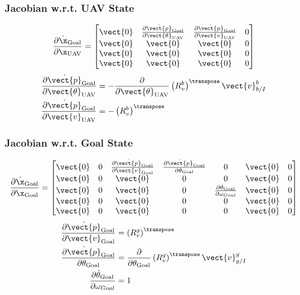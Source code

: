 \subsubsection{Jacobian w.r.t. UAV State}
\begin{equation}
  \frac{\partial \dot{\x}_{\text{Goal}}}{\partial \x_{\text{UAV}}}
  =
  \begin{bmatrix}
    \vect{0} & \frac{\partial \dot{\vect{p}}_{\text{Goal}}}{\partial
      \vect{\theta}_{\text{UAV}}} & \frac{\partial
      \dot{\vect{p}}_{\text{Goal}}}{\partial \vect{v}_{\text{UAV}}} & 0 \\
    \vect{0} & \vect{0} & \vect{0} & 0 \\
    \vect{0} & \vect{0} & \vect{0} & 0 \\
    \vect{0} & \vect{0} & \vect{0} & 0 \\
  \end{bmatrix}
\end{equation}
\begin{align}
    \frac{\partial \dot{\vect{p}}_{\text{Goal}}}{\partial
      \vect{\theta}_{\text{UAV}}}
      &=
      - \frac{\partial}{\partial \vect{\theta}_{\text{UAV}}}
      \left(R_{v}^{b}\right)^\transpose \vect{v}_{b/I}^{b}
      \\
    \frac{\partial \dot{\vect{p}}_{\text{Goal}}}{\partial \vect{v}_{\text{UAV}}}
      &=
      - \left(R_{v}^{b}\right)^\transpose
      \\
\end{align}

\subsubsection{Jacobian w.r.t. Goal State}
\begin{equation}
  \frac{\partial \dot{\x}_{\text{Goal}}}{\partial \x_{\text{Goal}}}
  =
  \begin{bmatrix}
    \vect{0} & 0 & \frac{\partial \dot{\vect{p}}_{\text{Goal}}}{\partial
      \vect{v}_{\text{Goal}}} & \frac{\partial
      \dot{\vect{p}}_{\text{Goal}}}{\partial \theta_{\text{Goal}}} & 0 & \vect{0} & 0 \\
    \vect{0} & 0 & \vect{0} & 0 & 0 & \vect{0} & 0 \\
    \vect{0} & 0 & \vect{0} & 0 & \frac{\partial
      \dot{\theta}_{\text{Goal}}}{\partial \omega_{Goal}} & \vect{0} & 0 \\
    \vect{0} & 0 & \vect{0} & 0 & 0 & \vect{0} & 0 \\
    \vect{0} & 0 & \vect{0} & 0 & 0 & \vect{0} & 0
  \end{bmatrix}
\end{equation}
\begin{align}
    \frac{\partial \dot{\vect{p}}_{\text{Goal}}}{\partial
      \vect{v}_{\text{Goal}}}
      &=
      \left(R_{v}^{g}\right)^\transpose
      \\
    \frac{\partial \dot{\vect{p}}_{\text{Goal}}}{\partial \theta_{\text{Goal}}}
      &=
      \frac{\partial}{\partial \theta_{\text{Goal}}} \left(R_{v}^{g}\right)^\transpose \vect{v}_{g/I}^{g}
      \\
    \frac{\partial \dot{\theta}_{\text{Goal}}}{\partial \omega_{Goal}}
      &=
      1
\end{align}

